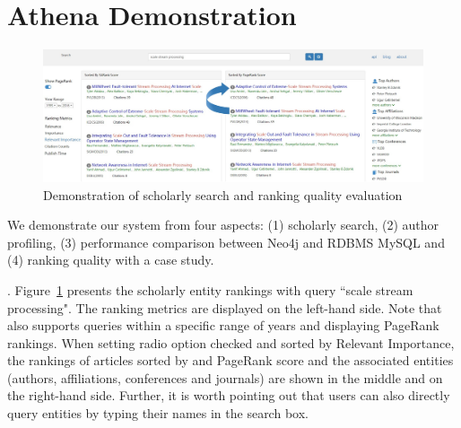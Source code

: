 \section{Athena Demonstration}
\label{sec-demo}

\begin{figure}[tp]
\centering
\includegraphics[width=\textwidth]{searchKeywords3.pdf}
\vspace{-3.5ex}
\caption{Demonstration of scholarly search and ranking quality evaluation}
\label{fig:searchKeywords}
\vspace{-2ex}
\end{figure}


We demonstrate our \oursystem system from four aspects: (1) scholarly search, (2) author profiling, (3) performance comparison between Neo4j and RDBMS MySQL and (4) ranking quality with a case study.



.
Figure~\ref{fig:searchKeywords} presents the scholarly entity rankings with query ``scale stream processing".
The ranking metrics are displayed on the left-hand side. Note that \oursystem also supports queries within a specific range of years and displaying PageRank rankings.
When setting radio option checked and sorted by Relevant Importance, the rankings of articles sorted by  \sarank and PageRank score and the associated entities (authors, affiliations, conferences and journals) are shown in the middle and on the right-hand side.
Further, it is worth pointing out that users can also directly query entities by typing their names in the search box.



